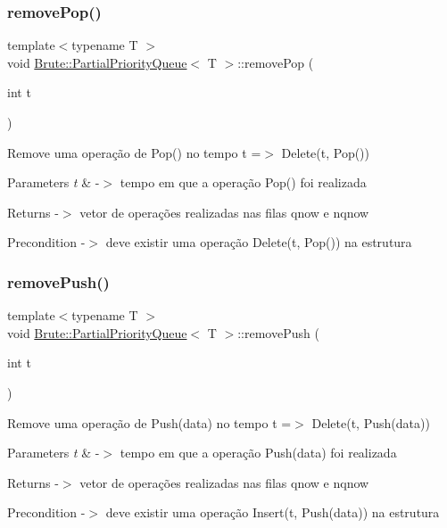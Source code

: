 \subsubsection{\texorpdfstring{remove\+Pop()}{removePop()}}
{\footnotesize\ttfamily template$<$typename T $>$ \\
void \hyperlink{classBrute_1_1PartialPriorityQueue}{Brute\+::\+Partial\+Priority\+Queue}$<$ T $>$\+::remove\+Pop (\begin{DoxyParamCaption}\item[{int}]{t }\end{DoxyParamCaption})}

Remove uma operação de Pop() no tempo t =$>$ Delete(t, Pop())


\begin{DoxyParams}{Parameters}
{\em t} & -\/$>$ tempo em que a operação Pop() foi realizada \\
\hline
\end{DoxyParams}
\begin{DoxyReturn}{Returns}
-\/$>$ vetor de operações realizadas nas filas qnow e nqnow 
\end{DoxyReturn}
\begin{DoxyPrecond}{Precondition}
-\/$>$ deve existir uma operação Delete(t, Pop()) na estrutura 
\end{DoxyPrecond}
\mbox{\label{classBrute_1_1PartialPriorityQueue_aca1b2c7c9adb51f1d0518ca0e2c79905}} 
\subsubsection{\texorpdfstring{remove\+Push()}{removePush()}}
{\footnotesize\ttfamily template$<$typename T $>$ \\
void \hyperlink{classBrute_1_1PartialPriorityQueue}{Brute\+::\+Partial\+Priority\+Queue}$<$ T $>$\+::remove\+Push (\begin{DoxyParamCaption}\item[{int}]{t }\end{DoxyParamCaption})}

Remove uma operação de Push(data) no tempo t =$>$ Delete(t, Push(data))


\begin{DoxyParams}{Parameters}
{\em t} & -\/$>$ tempo em que a operação Push(data) foi realizada \\
\hline
\end{DoxyParams}
\begin{DoxyReturn}{Returns}
-\/$>$ vetor de operações realizadas nas filas qnow e nqnow 
\end{DoxyReturn}
\begin{DoxyPrecond}{Precondition}
-\/$>$ deve existir uma operação Insert(t, Push(data)) na estrutura 
\end{DoxyPrecond}


